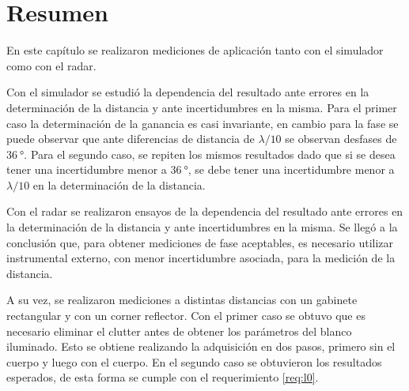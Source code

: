 \section{Resumen}

En este capítulo se realizaron mediciones de aplicación tanto con el simulador como con el radar.

Con el simulador se estudió la dependencia del resultado ante errores en la determinación de la distancia y ante incertidumbres en la misma. Para el primer caso la determinación de la ganancia es casi invariante, en cambio para la fase se puede observar que ante diferencias de distancia de $\lambda / 10$ se observan desfases de $\SI{36}{\degree}$. Para el segundo caso, se repiten los mismos resultados dado que si se desea tener una incertidumbre menor a $\SI{36}{\degree}$, se debe tener una incertidumbre menor a $\lambda / 10$ en la determinación de la distancia.

Con el radar se realizaron ensayos de la dependencia del resultado ante errores en la determinación de la distancia y ante incertidumbres en la misma. Se llegó a la conclusión que, para obtener mediciones de fase aceptables, es necesario utilizar instrumental externo, con menor incertidumbre asociada, para la medición de la distancia.

A su vez, se realizaron mediciones a distintas distancias con un gabinete rectangular y con un corner reflector. Con el primer caso se obtuvo que es necesario eliminar el clutter antes de obtener los parámetros del blanco iluminado. Esto se obtiene realizando la adquisición en dos pasos, primero sin el cuerpo y luego con el cuerpo. En el segundo caso se obtuvieron los resultados esperados, de esta forma se cumple con el requerimiento \ref{req:l0}.